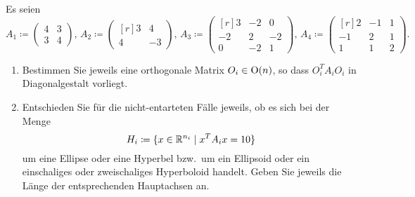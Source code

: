 \documentclass[a4paper, 10pt]{scrartcl}
\begin{document}
\begin{question}
  Es seien
  \[
    A_1
    \coloneqq
    \begin{pmatrix}
      4 & 3 \\
      3 & 4
    \end{pmatrix},
    \,
    A_2
    \coloneqq
    \begin{pmatrix*}[r]
      3 &  4  \\
      4 & -3
    \end{pmatrix*},
    \,
    A_3
    \coloneqq
    \begin{pmatrix*}[r]
       3  & -2  &  0  \\
      -2  &  2  & -2  \\
       0  & -2  &  1
    \end{pmatrix*},
    \,
    A_4
    \coloneqq
    \begin{pmatrix*}[r]
       2  & -1  & 1 \\
      -1  &  2  & 1 \\
       1  &  1  & 2
    \end{pmatrix*}.
  \]
  \begin{enumerate}[leftmargin=*]
    \item
      Bestimmen Sie jeweils eine orthogonale Matrix $O_i \in \mathrm{O}(n)$, so dass $O_i^T A_i O_i$ in Diagonalgestalt vorliegt.
    \item
      Entschieden Sie für die nicht-entarteten Fälle jeweils, ob es sich bei der Menge
      \[
        H_i \coloneqq \{ x \in \mathbb{R}^{n_i} \mid x^T A_i x = 10 \}
      \]
      um eine Ellipse oder eine Hyperbel bzw.\ um ein Ellipsoid oder ein einschaliges oder zweischaliges Hyperboloid handelt.
      Geben Sie jeweils die Länge der entsprechenden Hauptachsen an.
  \end{enumerate}
\end{question}


% 
\end{document}
